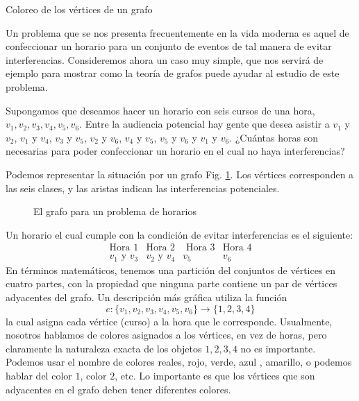 \begin{section}{Coloreo de los vértices de un grafo} \label{seccion-coloreo-de-vertices}

Un problema que se nos presenta frecuentemente en la vida moderna es aquel de confeccionar un horario para un conjunto de eventos de tal manera de evitar interferencias. Consideremos ahora un caso muy simple, que nos servirá de ejemplo para mostrar como la teoría de grafos puede ayudar al estudio de este problema.

Supongamos que deseamos hacer un horario con seis cursos de una hora, $v_1,v_2,v_3,v_4,v_5,v_6$. Entre la audiencia potencial hay gente que desea asistir a $v_1$ y $v_2$, $v_1$ y $v_4$, $v_3$ y $v_5$, $v_2$ y $v_6$, $v_4$ y $v_5$, $v_5$ y $v_6$ y $v_1$ y $v_6$. ¿Cuántas horas son necesarias para poder confeccionar un horario en el cual no haya interferencias?

Podemos representar la situación por un grafo Fig. \ref{f5.10}. Los vértices corresponden a las seis clases, y las aristas indican las interferencias potenciales.

\begin{figure}[ht]
    \begin{center}
    \end{center}
\caption{El grafo para un problema de horarios} \label{f5.10}
\end{figure}

Un horario el cual cumple con la condición de evitar interferencias es el siguiente:
$$
\begin{matrix}
\text{Hora 1} & \text{Hora 2} &\text{ Hora 3}& \text{Hora 4} \\
v_1 \text{ y } v_3 & v_2 \text{ y } v_4 & v_5 & v_6
\end{matrix}
$$
En términos matemáticos, tenemos una partición del conjuntos de vértices en cuatro partes, con la propiedad que ninguna parte contiene un par de vértices adyacentes del grafo. Un descripción más gráfica utiliza la función 
$$
c: \{ v_1,v_2,v_3,v_4,v_5,v_6\} \to  \{1,2,3,4\}
$$
la cual asigna cada vértice (curso) a la hora que le corresponde. Usualmente, nosotros hablamos de colores asignados a los vértices, en vez de horas, pero claramente la naturaleza exacta de los objetos $1,2,3,4$ no es importante. Podemos usar el nombre de colores reales, rojo, verde, azul , amarillo, o podemos hablar del
color $1$, color $2$, etc. Lo importante es que los vértices que son adyacentes en el grafo deben tener diferentes colores.


\end{section}
